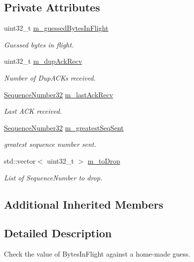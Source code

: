 \subsection*{Private Attributes}
\begin{DoxyCompactItemize}
\item 
uint32\+\_\+t \hyperlink{classTcpBytesInFlightTest_a746a64e877ab18748c5e84e6b48f9105}{m\+\_\+guessed\+Bytes\+In\+Flight}
\begin{DoxyCompactList}\small\item\em Guessed bytes in flight. \end{DoxyCompactList}\item 
uint32\+\_\+t \hyperlink{classTcpBytesInFlightTest_ab641cde492bd6498f83d5b54e0210554}{m\+\_\+dup\+Ack\+Recv}
\begin{DoxyCompactList}\small\item\em Number of Dup\+A\+C\+Ks received. \end{DoxyCompactList}\item 
\hyperlink{group__network_gacb2070e4e98d2d5135c9bede58f07a03}{Sequence\+Number32} \hyperlink{classTcpBytesInFlightTest_a69ac0a58e163339be5082e44e0e74abe}{m\+\_\+last\+Ack\+Recv}
\begin{DoxyCompactList}\small\item\em Last A\+CK received. \end{DoxyCompactList}\item 
\hyperlink{group__network_gacb2070e4e98d2d5135c9bede58f07a03}{Sequence\+Number32} \hyperlink{classTcpBytesInFlightTest_afc1cef29d8e27173973250647069060c}{m\+\_\+greatest\+Seq\+Sent}
\begin{DoxyCompactList}\small\item\em greatest sequence number sent. \end{DoxyCompactList}\item 
std\+::vector$<$ uint32\+\_\+t $>$ \hyperlink{classTcpBytesInFlightTest_a07a49022311b5cede6d01eef26ba3f33}{m\+\_\+to\+Drop}
\begin{DoxyCompactList}\small\item\em List of Sequence\+Number to drop. \end{DoxyCompactList}\end{DoxyCompactItemize}
\subsection*{Additional Inherited Members}


\subsection{Detailed Description}
Check the value of Bytes\+In\+Flight against a home-\/made guess. 

